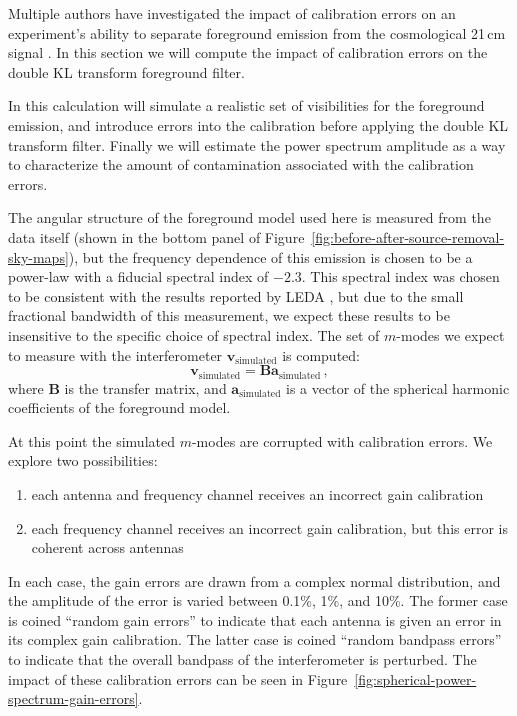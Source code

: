 \documentclass[twocolumn]{aastex62}
\renewcommand{\b}{\pmb}
\begin{document}
Multiple authors have investigated the impact of calibration errors on an experiment's ability to
separate foreground emission from the cosmological 21\,cm signal \citep{2016MNRAS.461.3135B,
2017MNRAS.470.1849E}. In this section we will compute the impact of calibration errors on the double
KL transform foreground filter.

In this calculation will simulate a realistic set of visibilities for the foreground emission, and
introduce errors into the calibration before applying the double KL transform filter. Finally we
will estimate the power spectrum amplitude as a way to characterize the amount of contamination
associated with the calibration errors.

The angular structure of the foreground model used here is measured from the data itself (shown in
the bottom panel of Figure~\ref{fig:before-after-source-removal-sky-maps}), but the frequency
dependence of this emission is chosen to be a power-law with a fiducial spectral index of $-2.3$.
This spectral index was chosen to be consistent with the results reported by LEDA
\citep{2018MNRAS.478.4193P}, but due to the small fractional bandwidth of this measurement, we
expect these results to be insensitive to the specific choice of spectral index. The set of
$m$-modes we expect to measure with the interferometer $\b v_\text{simulated}$ is computed:
\begin{equation}
    \b v_\text{simulated} = \b B\b a_\text{simulated}\,,
\end{equation}
where $\b B$ is the transfer matrix, and $\b a_\text{simulated}$ is a vector of the spherical
harmonic coefficients of the foreground model.

At this point the simulated $m$-modes are corrupted with calibration errors. We explore two
possibilities:
\begin{enumerate}
    \item each antenna and frequency channel receives an incorrect gain calibration
    \item each frequency channel receives an incorrect gain calibration, but this error is coherent
        across antennas
\end{enumerate}
In each case, the gain errors are drawn from a complex normal distribution, and the amplitude of the
error is varied between 0.1\%, 1\%, and 10\%. The former case is coined ``random gain errors'' to
indicate that each antenna is given an error in its complex gain calibration. The latter case is
coined ``random bandpass errors'' to indicate that the overall bandpass of the interferometer is
perturbed. The impact of these calibration errors can be seen in
Figure~\ref{fig:spherical-power-spectrum-gain-errors}.
\end{document}
